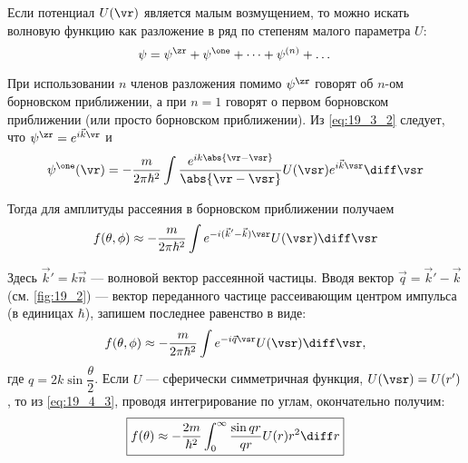Если потенциал $U(\vr)$ является малым возмущением, то можно искать волновую функцию как разложение в ряд по степеням малого параметра $U$:
\begin{equation}
\label{eq:19_4_1}
\psi = \psi^\zr + \psi^\one + \dots + \psi^{(n)} + \dots
\end{equation}

При использовании $n$ членов разложения помимо $\psi^\zr$ говорят об $n$-ом борновском приближении, а при $n = 1$ говорят о первом борновском приближении (или просто борновском приближении). Из \eqref{eq:19_3_2} следует, что $\psi^\zr = e^{i \vec{k} \vr}$ и
\begin{equation}
\label{eq:19_4_2}
\psi^\one(\vr) = -\frac{m}{2\pi \hbar^2} \int \frac{e^{ik \abs{\vr - \vsr}}}{\abs{\vr - \vsr}} U(\vsr) e^{i \vec{k} \vsr} \diff\vsr
\end{equation}

Тогда для амплитуды рассеяния в борновском приближении получаем
$$
f(\theta, \phi) \approx  -\frac{m}{2\pi \hbar^2} \int e^{-i(\vec{k}'-\vec{k})\vsr} U(\vsr) \diff\vsr
$$

\begin{figure}[h!]
\centering
{}
\caption{} \label{fig:19_2}
\end{figure}

Здесь $\vec{k}' = k \vec{n}$ --- волновой вектор рассеянной частицы. Вводя вектор $\vec{q} = \vec{k}'- \vec{k}$ (см. \autoref{fig:19_2}) --- вектор переданного частице рассеивающим центром импульса (в единицах $\hbar$), запишем последнее равенство в виде:
\begin{equation}
\label{eq:19_4_3}
f(\theta, \phi) \approx  -\frac{m}{2\pi \hbar^2} \int e^{-i \vec{q}\vsr} U(\vsr) \diff\vsr,
\end{equation}
где $q = 2k \sin \dfrac{\theta}{2}$. Если $U$ --- сферически симметричная функция, ${U(\vsr) = U(r')}$, то из \eqref{eq:19_4_3}, проводя интегрирование по углам, окончательно получим:
\begin{equation}
\label{eq:19_4_4}
\boxed{f(\theta) \approx -\frac{2m}{\hbar^2} \int_0^\infty \frac{\sin qr}{qr}U(r)r^2 \diff r}
\end{equation}

